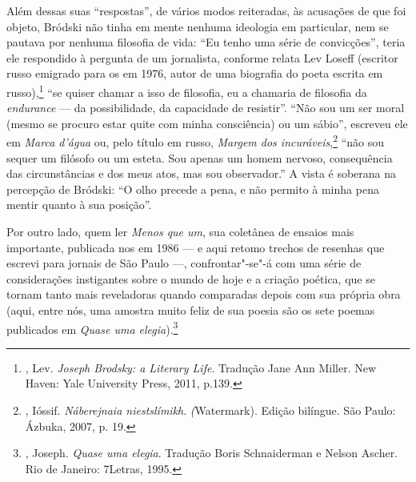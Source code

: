 Além dessas suas ``respostas'', de vários modos reiteradas, às
acusações de que foi objeto, Bródski não tinha em mente nenhuma
ideologia em particular, nem se pautava por nenhuma filosofia de vida:
``Eu tenho uma série de convicções'', teria ele respondido à
pergunta de um jornalista, conforme relata Lev Loseff (escritor russo emigrado
para os  em 1976, autor de uma biografia do poeta escrita
em russo),\footnote{, Lev. \emph{Joseph
 Brodsky: a Literary Life}. Tradução Jane Ann Miller. New Haven:
 Yale University Press, 2011, p.139.} ``se quiser
chamar a isso de filosofia, eu a chamaria de filosofia da
\emph{endurance} --- da possibilidade, da capacidade de resistir''.
``Não sou um ser moral (mesmo se procuro estar quite com minha
consciência) ou um sábio'', escreveu ele em \emph{Marca d'água} ou, pelo título em russo, \emph{Margem dos
incuráveis},\footnote{, Ióssif.
 \emph{Náberejnaia niestslímikh}. \emph(Watermark). Edição bilíngue.
 São Paulo: Ázbuka, 2007, p. 19.} ``não sou sequer um filósofo ou um
esteta. Sou apenas um homem nervoso, consequência das circunstâncias e
dos meus atos, mas sou observador.'' A vista é soberana na percepção de
Bródski: ``O olho precede a pena, e não permito à minha pena mentir
quanto à sua posição''.

Por outro lado, quem ler \emph{Menos que um}, sua coletânea de ensaios
mais importante, publicada nos  em 1986 --- e aqui
retomo trechos de resenhas que escrevi para jornais de São Paulo ---,
confrontar"-se"-á com uma série de considerações instigantes sobre o mundo de hoje e a criação poética, que se tornam tanto mais
reveladoras quando comparadas depois com sua própria obra (aqui, entre
nós, uma amostra muito feliz de sua poesia são os sete poemas publicados
em \emph{Quase uma elegia}).\footnote{,
 Joseph. \emph{Quase uma elegia}. Tradução Boris Schnaiderman e Nelson
 Ascher. Rio de Janeiro: 7Letras, 1995.}


